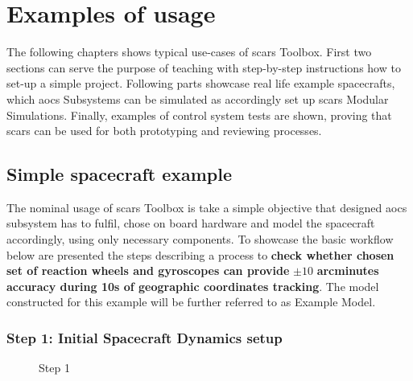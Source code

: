 \section{Examples of usage}\label{sec:examples}
    The following chapters shows typical use-cases of \ac{scars} Toolbox. First two sections can serve the purpose of teaching with step-by-step instructions how to set-up a simple project. Following parts showcase real life example spacecrafts, which \ac{aocs} Subsystems can be simulated as accordingly set up \ac{scars} Modular Simulations. Finally, examples of control system tests are shown, proving that \ac{scars} can be used for both prototyping and reviewing processes.


    \subsection{Simple spacecraft example}\label{sec:simple_spacecraft}
        The nominal usage of \ac{scars} Toolbox is take a simple objective that designed \ac{aocs} subsystem has to fulfil, chose on board hardware and model the spacecraft accordingly, using only necessary components. To showcase the basic workflow below are presented the steps describing a process to \textbf{check whether chosen set of reaction wheels and gyroscopes can provide} $\pm10$ \textbf{arcminutes accuracy during 10s of geographic coordinates tracking}. The model constructed for this example will be further referred to as Example Model. 

        \subsubsection*{Step 1: Initial Spacecraft Dynamics setup}
            \begin{figure}[H]
                \centering
                \qquad
                \caption{Step 1}%
                \label{fig:step1}%
            \end{figure}

